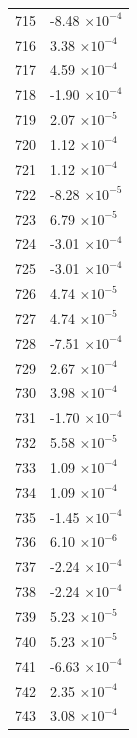 \documentclass[a4paper,11pt]{article}
\begin{document}
\begin{center}
\begin{longtable}{|R{1.5cm}|R{2.5cm}|}
  715 &        -8.48 $\times 10^{          -4}$ \\
  716 &         3.38 $\times 10^{          -4}$ \\
  717 &         4.59 $\times 10^{          -4}$ \\
  718 &        -1.90 $\times 10^{          -4}$ \\
  719 &         2.07 $\times 10^{          -5}$ \\
  720 &         1.12 $\times 10^{          -4}$ \\
  721 &         1.12 $\times 10^{          -4}$ \\
  722 &        -8.28 $\times 10^{          -5}$ \\
  723 &         6.79 $\times 10^{          -5}$ \\
  724 &        -3.01 $\times 10^{          -4}$ \\
  725 &        -3.01 $\times 10^{          -4}$ \\
  726 &         4.74 $\times 10^{          -5}$ \\
  727 &         4.74 $\times 10^{          -5}$ \\
  728 &        -7.51 $\times 10^{          -4}$ \\
  729 &         2.67 $\times 10^{          -4}$ \\
  730 &         3.98 $\times 10^{          -4}$ \\
  731 &        -1.70 $\times 10^{          -4}$ \\
  732 &         5.58 $\times 10^{          -5}$ \\
  733 &         1.09 $\times 10^{          -4}$ \\
  734 &         1.09 $\times 10^{          -4}$ \\
  735 &        -1.45 $\times 10^{          -4}$ \\
  736 &         6.10 $\times 10^{          -6}$ \\
  737 &        -2.24 $\times 10^{          -4}$ \\
  738 &        -2.24 $\times 10^{          -4}$ \\
  739 &         5.23 $\times 10^{          -5}$ \\
  740 &         5.23 $\times 10^{          -5}$ \\
  741 &        -6.63 $\times 10^{          -4}$ \\
  742 &         2.35 $\times 10^{          -4}$ \\
  743 &         3.08 $\times 10^{          -4}$ \\

\end{longtable}
\end{center}
\end{document}
